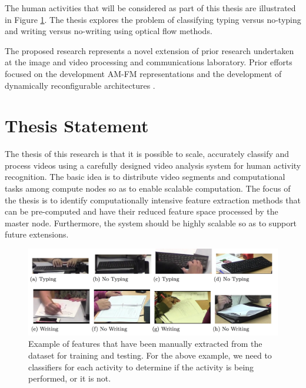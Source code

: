 The human activities that will be considered as part of this thesis are
illustrated in Figure \ref{fig:typing_writing}. The thesis explores the problem
of classifying typing versus no-typing and writing versus no-writing using
optical flow methods.

The proposed research represents a novel extension of prior research undertaken
at the image and video processing and communications laboratory. Prior efforts
focused on the development AM-FM representations \cite{5378645} \cite{Cesar2012}
\cite{6693707} \cite{loizou2014despeckle} \cite{agurto2011automatic}
\cite{5590295} \cite{5414522} \cite{5405648} \cite{murray2012} \cite{4135672}
\cite{908521} \cite{765139} \cite{janakiramanan2011tree} \cite{985561}
\cite{931092} \cite{923291} \cite{758405} and the development of dynamically
reconfigurable architectures \cite{Carranza2016} \cite{llamocca2014dynamic}
\cite{7418203} \cite{7015949} \cite{jiang2014dynamically} \cite{6806021}
\cite{6810466}.



\section{\label{section:thesis_statement}Thesis Statement}
The thesis of this research is that it is possible to scale, accurately classify
and process videos using a carefully designed video analysis system for human
activity recognition. The basic idea is to distribute video segments and
computational tasks among compute nodes so as to enable scalable computation.
The focus of the thesis is to identify computationally intensive feature
extraction methods that can be pre-computed and have their reduced feature space
processed by the master node. Furthermore, the system should be highly scalable
so as to support future extensions.


\begin{figure}[h]

  \centering
  \includegraphics[width=\textwidth]{figures/typing_writing_clip}
  \caption{Example of features that have been manually extracted from the dataset
  for training and testing. For the above example, we need to classifiers for each
  activity to determine if the activity is being performed, or it is not.}
  \label{fig:typing_writing}
\end{figure}

